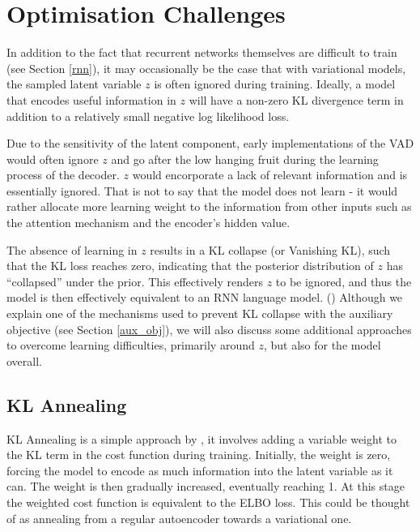 \documentclass[12pt,twoside]{report}
\begin{document}
\section{Optimisation Challenges}
\label{optimisation_challenges}

In addition to the fact that recurrent networks themselves are difficult to train (see Section \ref{rnn}), it may occasionally be the case that with variational models, the sampled latent variable $z$ is often ignored during training. Ideally, a model that encodes useful information in $z$ will have a non-zero KL divergence term in addition to a relatively small negative log likelihood loss. 

Due to the sensitivity of the latent component, early implementations of the VAD would often ignore $z$ and go after the low hanging fruit during the learning process of the decoder. $z$ would encorporate a lack of relevant information and is essentially ignored. That is not to say that the model does not learn - it would rather allocate more learning weight to the information from other inputs such as the attention mechanism and the encoder's hidden value.

The absence of learning in $z$ results in a KL collapse (or Vanishing KL), such that the KL loss reaches zero, indicating that the posterior distribution of $z$ has ``collapsed'' under the prior. This effectively renders $z$ to be ignored, and thus the model is then effectively equivalent to an RNN language model. (\cite{bowman_generating_2015}) Although we explain one of the mechanisms used to prevent KL collapse with the auxiliary objective (see Section \ref{aux_obj}), we will also discuss some additional approaches to overcome learning difficulties, primarily around $z$, but also for the model overall.

\subsection{KL Annealing}

KL Annealing is a simple approach by \cite{bowman_generating_2015}, it involves adding a variable weight to the KL term in the cost function during training. Initially, the weight is zero, forcing the model to encode as much information into the latent variable as it can. The weight is then gradually increased, eventually reaching 1. At this stage the weighted cost function is equivalent to the ELBO loss. This could be thought of as annealing from a regular autoencoder towards a variational one.
\end{document}
